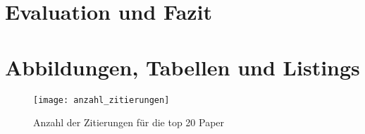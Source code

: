 \chapter{Evaluation und Fazit}\label{ch:results}







%

\newpage
\appendix

\chapter{Abbildungen, Tabellen und Listings}\label{ch:results}

\begin{figure}[ht]

    \texttt{[image: anzahl\_zitierungen]}
  \caption[]{Anzahl der Zitierungen für die top 20 Paper}
\label{fig:paperrank}
\end{figure}




